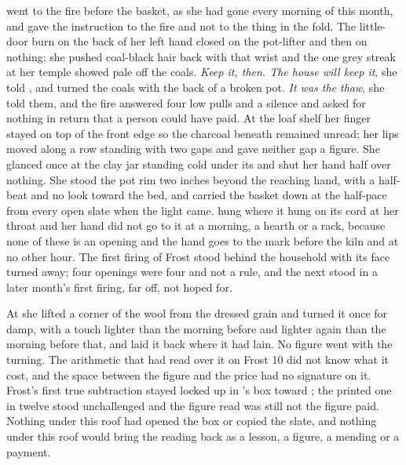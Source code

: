  went to the fire before the basket, as she had gone every morning of this month, and gave the instruction to the fire and not to the thing in the fold. The little-door burn on the back of her left hand closed on the pot-lifter and then on nothing; she pushed coal-black hair back with that wrist and the one grey streak at her temple showed pale off the coals. \emph{Keep it, then. The house will keep it}, she told , and turned the coals with the back of a broken pot. \emph{It was the thaw}, she told them, and the fire answered four low pulls and a silence and asked for nothing in return that a person could have paid. At the loaf shelf her finger stayed on top of the front edge so the charcoal beneath remained unread; her lips moved along a row standing with two gaps and gave neither gap a figure. She glanced once at the clay jar standing cold under its  and shut her hand half over nothing. She stood the pot rim two inches beyond the reaching hand, with a half-beat and no look toward the bed, and carried the basket down at the half-pace from every open slate when the light came.  hung where it hung on its cord at her throat and her hand did not go to it at a morning, a hearth or a rack, because none of these is an opening and the hand goes to the mark before the kiln and at no other hour. The first firing of Frost stood behind the household with its face turned away; four openings were four and not a rule, and the next stood in a later month's first firing, far off, not hoped for.

At  she lifted a corner of the wool from the dressed grain and turned it once for damp, with a touch lighter than the morning before and lighter again than the morning before that, and laid it back where it had lain. No figure went with the turning. The arithmetic that had read over it on Frost 10 did not know what it cost, and the space between the figure and the price had no signature on it. Frost's first true subtraction stayed locked up  in 's box toward ; the printed one in twelve stood unchallenged and the figure read was still not the figure paid. Nothing under this roof had opened the box or copied the slate, and nothing under this roof would bring the reading back as a lesson, a figure, a mending or a payment.

